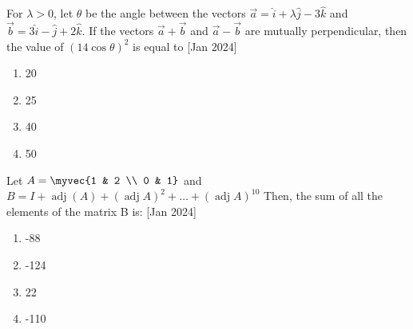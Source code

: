 \iffalse
\title{Assignment}
\author{ee24btech11059}
\section{mcq-single}
\fi
   	\item{
    		
    		For $\lambda>0$, let $\theta$ be the angle between the vectors $\vec{a}=\hat{i}+\lambda \hat{j}-3 \hat{k}$ and $\vec{b}=3 \hat{i}-\hat{j}+2 \hat{k}$. If the vectors $\vec{a}+\vec{b}$ and $\vec{a}-\vec{b}$ are mutually perpendicular, then the value of $(14 \cos\theta)^{2}$ is equal to\text{ }
    		\hfill
    		{[Jan 2024]}
    		\begin{multicols}{4}
    			\begin{enumerate}
    				\item 20
    				\item 25
    				\item 40
    				\item 50
    			\end{enumerate}
    		\end{multicols}
    	}
    \item{
          	Let $A=\myvec{1 & 2 \\ 0 & 1}$ and $B=I+\operatorname{adj}(A)+(\operatorname{adj} A)^{2}+\ldots+(\operatorname{adj} A)^{10}$
          	Then, the sum of all the elements of the matrix B is: \text{  } \hfill
                {[Jan 2024]}
                \begin{multicols}{4}
					\begin{enumerate}
						\item -88
						\item -124
						\item 22
						\item -110
					\end{enumerate}
				\end{multicols}
            }

